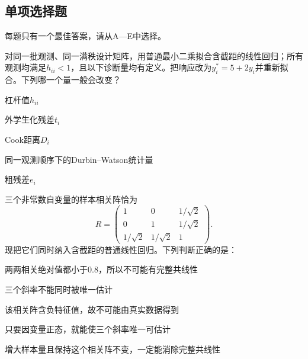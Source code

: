\subsection{单项选择题}
每题只有一个最佳答案，请从A—E中选择。

\par\noindent\begin{minipage}{\linewidth}
对同一批观测、同一满秩设计矩阵，用普通最小二乘拟合含截距的线性回归；所有观测均满足$h_{ii}<1$，且以下诊断量均有定义。把响应改为$y_i^*=5+2y_i$并重新拟合。下列哪一个量一般会改变？
\begin{choices}
\item 杠杆值$h_{ii}$
\item 外学生化残差$t_i$
\item Cook距离$D_i$
\item 同一观测顺序下的Durbin--Watson统计量
\item 粗残差$e_i$
\end{choices}
\end{minipage}\par\medskip

\par\noindent\begin{minipage}{\linewidth}
三个非常数自变量的样本相关阵恰为\[R=\begin{pmatrix}1&0&1/\sqrt2\\0&1&1/\sqrt2\\1/\sqrt2&1/\sqrt2&1\end{pmatrix}.\]现把它们同时纳入含截距的普通线性回归。下列判断正确的是：
\begin{choices}
\item 两两相关绝对值都小于0.8，所以不可能有完整共线性
\item 三个斜率不能同时被唯一估计
\item 该相关阵含负特征值，故不可能由真实数据得到
\item 只要因变量正态，就能使三个斜率唯一可估计
\item 增大样本量且保持这个相关阵不变，一定能消除完整共线性
\end{choices}
\end{minipage}\par\medskip

